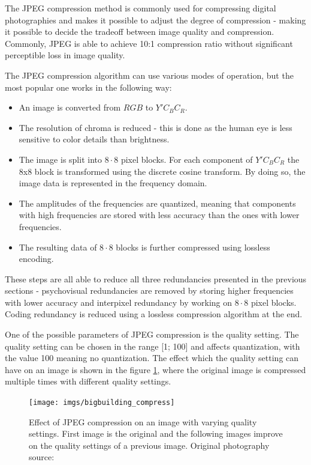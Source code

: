 \documentclass[thesis=M,english]{FITthesis}[2012/10/20]
\begin{document}
The JPEG compression method is commonly used for compressing digital
photographies and makes it possible to adjust the degree of compression
- making it possible to decide the tradeoff between image quality and
compression. Commonly, JPEG is able to achieve 10:1 compression ratio
without significant perceptible loss in image quality.\cite{nasajpeg}

The JPEG compression algorithm can use various modes of operation, but
the most popular one works in the following way:
\begin{itemize}
    \item An image is converted from $RGB$ to $Y'C_BC_R$.
    \item The resolution of chroma is reduced - this is done as the human eye is less
    sensitive to color details than brightness.
    \item The image is split into $8 \cdot 8$ pixel blocks. For each component of $Y'C_BC_R$
    the 8x8 block is transformed using the discrete cosine transform. By doing so,
    the image data is represented in the frequency domain.
    \item The amplitudes of the frequencies are quantized, meaning that components
    with high frequencies are stored with less accuracy than the ones with lower
    frequencies.
    \item The resulting data of $8 \cdot 8$ blocks is further compressed using lossless
    encoding.
\end{itemize}
These steps are all able to reduce all three redundancies presented in the previous
sections - psychovisual redundancies are removed by storing higher frequencies with
lower accuracy and interpixel redundancy by working on $8 \cdot 8$ pixel blocks. Coding
redundancy is reduced using a lossless compression algorithm at the end.

One of the possible parameters of JPEG compression is the quality setting. The quality
setting can be chosen in the range [1; 100] and affects quantization, with the value
100 meaning no quantization. The effect which the quality setting can have on an
image is shown in the figure \ref{fig:jpegquality}, where the original image is compressed
multiple times with different quality settings.

\begin{figure}[h]
  \centering
  \texttt{[image: imgs/bigbuilding\_compress]}
  \caption[Accuracy of JPEG with different quality settings]{Effect of JPEG compression on an image with varying quality settings.
           First image is the original and the following images improve on the
           quality settings of a previous image. Original photography source: \cite{imgcomprbenchmark}}
  \label{fig:jpegquality}
\end{figure}
\end{document}
